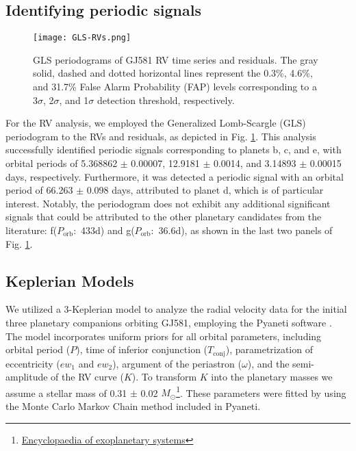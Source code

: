 \documentclass[baaa]{baaa}
\begin{document}
\subsection{Identifying periodic signals}
\begin{figure}[t]
    \centering
    \texttt{[image: GLS-RVs.png]}
    \caption{GLS periodograms of GJ581 RV time series and residuals. The gray solid, dashed and dotted horizontal lines represent the 0.3\%, 4.6\%, and 31.7\% False Alarm Probability (FAP) levels corresponding to a 3$\sigma$, 2$\sigma$, and 1$\sigma$ detection threshold, respectively.}
    \label{fig:gls}
\end{figure}

For the RV analysis, we employed the Generalized Lomb-Scargle (GLS) periodogram \citep{2009GLS} to the RVs and residuals, as depicted in Fig. \ref{fig:gls}. This analysis successfully identified periodic signals corresponding to planets b, c, and e, with orbital periods of 5.368862 $\pm$ 0.00007, 12.9181 $\pm$ 0.0014, and 3.14893 $\pm$ 0.00015 days, respectively. Furthermore, it was detected a periodic signal with an orbital period of 66.263 $\pm$ 0.098 days, attributed to planet d, which is of particular interest. Notably, the periodogram does not exhibit any additional significant signals that could be attributed to the other planetary candidates from the literature: f($P_{\mathrm{orb}}:$ 433d) and g($P_{\mathrm{orb}}:$ 36.6d), as shown in the last two panels of Fig. \ref{fig:gls}.

\subsection{Keplerian Models}

We utilized a 3-Keplerian model to analyze the radial velocity data for the initial three planetary companions orbiting GJ581, employing the {\sc Pyaneti} software \citep{2022pyanetiII}. The model incorporates uniform priors for all orbital parameters, including orbital period ($P$), time of inferior conjunction ($T_{\text{conj}}$), parametrization of eccentricity ($ew_1$ and $ew_2$), argument of the periastron ($\omega$), and the semi-amplitude of the RV curve ($K$). To transform $K$ into the planetary masses we assume a stellar mass of 0.31 $\pm$ 0.02 $M_\odot$\footnote{\href{https://exoplanet.eu/catalog/gj\_581\_b--301/\#publication\_8432}{Encyclopaedia of exoplanetary systems}}. These parameters were fitted by using the Monte Carlo Markov Chain method included in {\sc Pyaneti}.
\end{document}
